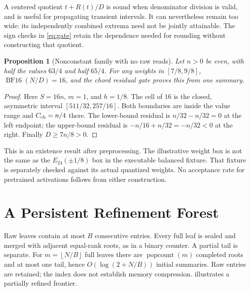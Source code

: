 \documentclass{article}
\theoremstyle{plain}
\newtheorem{proposition}[theorem]{Proposition}
\theoremstyle{definition}
\theoremstyle{remark}
\newcommand{\BF}{\operatorname{BF16}}
\newcommand{\E}{E_{24}}
\newcommand{\floor}[1]{\left\lfloor#1\right\rfloor}
\begin{document}
A centered quotient $t+R(t)/D$ is sound when denominator division is valid,
and is useful for propagating transient intervals. It can nevertheless
remain too wide: its independently combined extrema need not be jointly
attainable. The sign checks in \cref{eq:gate} retain the dependence needed
for rounding without constructing that quotient.

\begin{proposition}[Nonconstant family with no raw reads]
\label{prop:family}
Let $n>0$ be even, with half the values $63/4$ and half $65/4$. For any
weights in $[7/8,9/8]$, $\BF(N/D)=16$, and the chord residual gate proves
this from one summary.
\end{proposition}
\begin{proof}
Here $S=16n$, $m=1$, and $h=1/8$. The cell of $16$ is the closed,
asymmetric interval $[511/32,257/16]$. Both boundaries are inside the
value range and $C_{\rm ch}=n/4$ there. The lower-bound residual is
$n/32-n/32=0$ at the left endpoint; the upper-bound residual is
$-n/16+n/32=-n/32<0$ at the right. Finally $D\ge7n/8>0$.
\end{proof}

This is an existence result after preprocessing. The illustrative weight
box is not the same as the $\E(\pm1/8)$ box in the executable balanced
fixture. That fixture is separately checked against its actual quantized
weights. No acceptance rate for pretrained activations follows from either
construction.

\section{A Persistent Refinement Forest}
\label{sec:forest}

Raw leaves contain at most $B$ consecutive entries. Every full leaf is
sealed and merged with adjacent equal-rank roots, as in a binary counter.
A partial tail is separate. For $m=\floor{N/B}$ full leaves there are
$\operatorname{popcount}(m)$ completed roots and at most one tail, hence
$O(\log(2+N/B))$ initial summaries. Raw entries are retained; the index
does not establish memory compression.
 illustrates a partially refined frontier.
\end{document}
